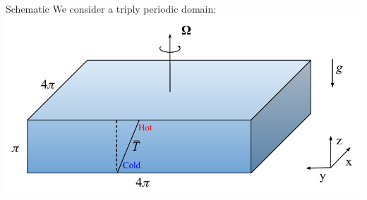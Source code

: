 \documentclass[aspecttatio=169]{beamer}
\begin{document}
\begin{frame}{Schematic}
    We consider a triply periodic domain: 
    \includegraphics[width = \textwidth]{images/schematic.pdf}

\end{frame}
\end{document}
